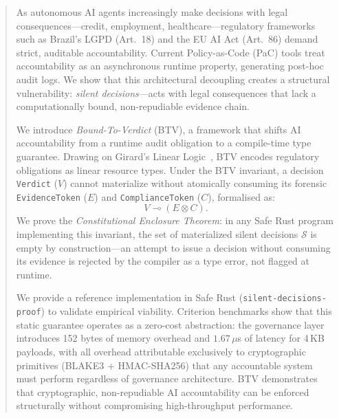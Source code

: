 
\begin{abstract}
As autonomous AI agents increasingly make decisions with legal
consequences---credit, employment, healthcare---regulatory frameworks
such as Brazil's LGPD (Art.~18) and the EU AI Act (Art.~86) demand
strict, auditable accountability.
Current Policy-as-Code (PaC) tools treat accountability as an
asynchronous runtime property, generating post-hoc audit logs.
We show that this architectural decoupling creates a structural
vulnerability: \emph{silent decisions}---acts with legal consequences
that lack a computationally bound, non-repudiable evidence chain.

We introduce \emph{Bound-To-Verdict} (BTV), a framework that shifts
AI accountability from a runtime audit obligation to a compile-time
type guarantee.
Drawing on Girard's Linear Logic~\cite{girard1987linear}, BTV encodes
regulatory obligations as linear resource types.
Under the BTV invariant, a decision \texttt{Verdict} ($V$) cannot
materialize without atomically consuming its forensic
\texttt{EvidenceToken} ($E$) and \texttt{ComplianceToken} ($C$),
formalised as:
\[
  V \multimap (E \otimes C).
\]
We prove the \emph{Constitutional Enclosure Theorem}: in any Safe Rust
program implementing this invariant, the set of materialized silent
decisions $\mathcal{S}$ is empty by construction---an attempt to issue
a decision without consuming its evidence is rejected by the compiler
as a type error, not flagged at runtime.

We provide a reference implementation in Safe Rust
(\texttt{silent-decisions-proof}) to validate empirical viability.
Criterion benchmarks show that this static guarantee operates as a
zero-cost abstraction: the governance layer introduces 152 bytes of
memory overhead and $1.67\,\mu$s of latency for 4\,KB payloads, with
all overhead attributable exclusively to cryptographic primitives
(BLAKE3 + HMAC-SHA256) that any accountable system must perform
regardless of governance architecture.
BTV demonstrates that cryptographic, non-repudiable AI accountability
can be enforced structurally without compromising high-throughput
performance.
\end{abstract}
